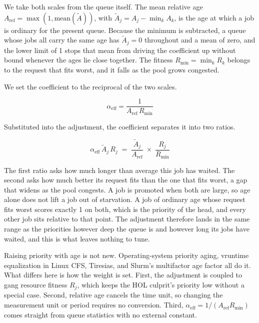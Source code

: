 \documentclass{ieeetj}
\begin{document}
We take both scales from the queue itself. The mean relative age $A_{\text{ref}} = \max(1,\text{mean}(\tilde A))$, with $\tilde A_j = A_j - \min_k A_k$, is the age at which a job is ordinary for the present queue. Because the minimum is subtracted, a queue whose jobs all carry the same age has $\tilde A_j=0$ throughout and a mean of zero, and the lower limit of 1 stops that mean from driving the coefficient up without bound whenever the ages lie close together. The fitness $R_{\min}=\min_k R_k$ belongs to the request that fits worst, and it falls as the pool grows congested.

We set the coefficient to the reciprocal of the two scales.

\begin{equation}
\alpha_{\text{eff}} = \frac{1}{A_{\text{ref}}\,R_{\min}}
\label{eq:auto-alpha}
\end{equation}

Substituted into the adjustment, the coefficient separates it into two ratios.

\begin{equation}
\alpha_{\text{eff}}\,\tilde A_j\, R_j \;=\; \frac{\tilde A_j}{A_{\text{ref}}} \;\times\; \frac{R_j}{R_{\min}}
\label{eq:alphaeff-define}
\end{equation}

The first ratio asks how much longer than average this job has waited. The second asks how much better its request fits than the one that fits worst, a gap that widens as the pool congests. A job is promoted when both are large, so age alone does not lift a job out of starvation. A job of ordinary age whose request fits worst scores exactly 1 on both, which is the priority of the head, and every other job sits relative to that point. The adjustment therefore lands in the same range as the priorities however deep the queue is and however long its jobs have waited, and this is what leaves nothing to tune.

Raising priority with age is not new. Operating-system priority aging, vruntime equalization in Linux CFS, Tiresias\cite{gu2019tiresias}, and Slurm's multifactor age factor all do it. What differs here is how the weight is set. First, the adjustment is coupled to gang resource fitness $R_j$, which keeps the HOL culprit's priority low without a special case. Second, relative age cancels the time unit, so changing the measurement unit or period requires no conversion. Third, $\alpha_{\text{eff}}=1/(A_{\text{ref}}R_{\min})$ comes straight from queue statistics with no external constant.
\end{document}
